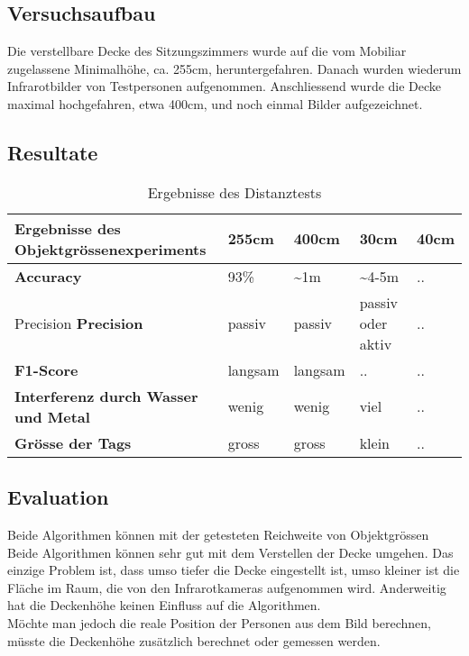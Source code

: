 \subsection{Versuchsaufbau}

Die verstellbare Decke des Sitzungszimmers wurde auf die vom Mobiliar zugelassene Minimalhöhe, ca. 255cm, heruntergefahren. Danach wurden wiederum Infrarotbilder von Testpersonen aufgenommen. Anschliessend wurde die Decke maximal hochgefahren, etwa 400cm, und noch einmal Bilder aufgezeichnet.

\subsection{Resultate}

\begin{table}[H]
	\begin{tabularx}{\textwidth}{|X|X|X|X|X|}
		\hline
		\textbf{Ergebnisse des Objektgrössenexperiments} & \textbf{255cm} & \textbf{400cm} & \textbf{30cm} & \textbf{40cm}\\
		\hline 
		\textbf{Accuracy} & 93\% & \textasciitilde 1m & \textasciitilde 4-5m & ..\\
		\hline  Precision
		\textbf{Precision} & passiv & passiv & passiv oder aktiv & ..\\
		\hline
		\textbf{F1-Score} & langsam & langsam & .. & ..\\
		\hline
		\textbf{Interferenz durch Wasser und Metal} & wenig & wenig & viel & ..\\
		\hline
		\textbf{Grösse der Tags} & gross & gross & klein & ..\\
		\hline
	\end{tabularx}
	\caption{Ergebnisse des Distanztests}
	\label{tbl:distance}
\end{table}

\subsection{Evaluation}
Beide Algorithmen können mit der getesteten Reichweite von Objektgrössen 
Beide Algorithmen können sehr gut mit dem Verstellen der Decke umgehen. Das einzige Problem ist, dass umso tiefer die Decke eingestellt ist, umso kleiner ist die Fläche im Raum, die von den Infrarotkameras aufgenommen wird. Anderweitig hat die Deckenhöhe keinen Einfluss auf die Algorithmen.\\
Möchte man jedoch die reale Position der Personen aus dem Bild berechnen, müsste die Deckenhöhe zusätzlich berechnet oder gemessen werden.


